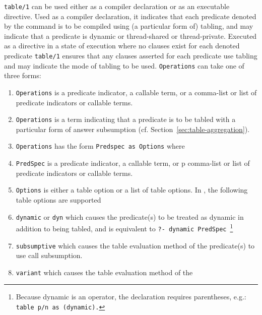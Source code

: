 \begin{description}


%
{\tt table/1} can be used either as a compiler declaration or as an
executable directive.  Used as a compiler declaration, it indicates
that each predicate denoted by the command is to be compiled using (a
particular form of) tabling, and may indicate that a predicate is
dynamic or thread-shared or thread-private.  Executed as a directive
in a state of execution where no clauses exist for each denoted
predicate {\tt table/1} ensures that any clauses asserted for each
predicate use tabling and may indicate the mode of tabling to be used.
{\tt Operations} can take one of three forms:
%
\begin{enumerate}
\item {\tt Operations} is a predicate indicator, a callable term, or
  a comma-list or list of predicate indicators or callable terms.
%
\item {\tt Operations} is a term indicating that a predicate is to be
  tabled with a particular form of answer subsumption
  (cf. Section~\ref{sec:table-aggregation}).
%
\item {\tt Operations} has the form {\tt Predspec as Options} where
\bi
\item {\tt PredSpec} is a predicate indicator, a callable term, or p
  comma-list or list of predicate indicators or callable terms.
%
\item {\tt Options} is either a table option or a list of table
  options.  In \version, the following table options are supported
\bi
\item {\tt dynamic} or {\tt dyn} which causes the predicate(s) to be
  treated as dynamic in addition to being tabled, and is equivalent to
  {\tt ?- dynamic PredSpec}~\footnote{Because dynamic is an operator,
    the declaration requires parentheses, e.g.: {\tt table p/n as
      (dynamic).}}
%
\item {\tt subsumptive} which causes the table evaluation method of
  the predicate(s) to use call subsumption.
%
\item {\tt variant} which causes the table evaluation method of the

\end{enumerate}
\end{description}
